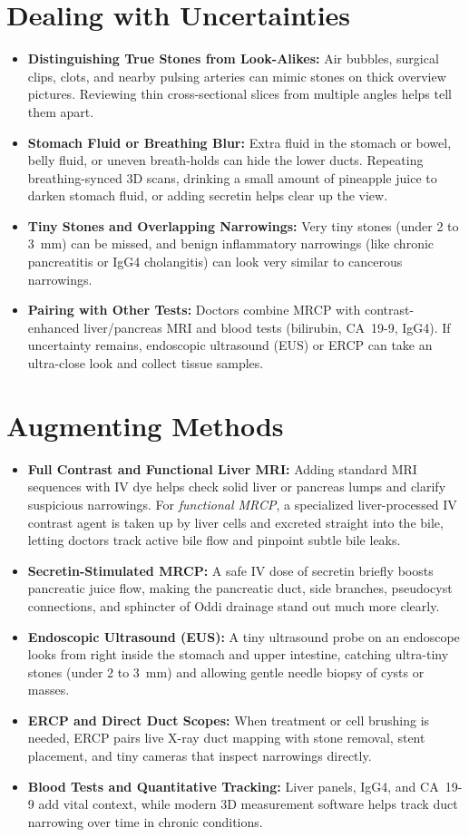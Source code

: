 \section{Dealing with Uncertainties}
\begin{itemize}
\item \textbf{Distinguishing True Stones from Look-Alikes:} Air bubbles, surgical clips, clots, and nearby pulsing arteries can mimic stones on thick overview pictures. Reviewing thin cross-sectional slices from multiple angles helps tell them apart.
\item \textbf{Stomach Fluid or Breathing Blur:} Extra fluid in the stomach or bowel, belly fluid, or uneven breath-holds can hide the lower ducts. Repeating breathing-synced 3D scans, drinking a small amount of pineapple juice to darken stomach fluid, or adding secretin helps clear up the view.
\item \textbf{Tiny Stones and Overlapping Narrowings:} Very tiny stones (under 2 to 3~mm) can be missed, and benign inflammatory narrowings (like chronic pancreatitis or IgG4 cholangitis) can look very similar to cancerous narrowings.
\item \textbf{Pairing with Other Tests:} Doctors combine MRCP with contrast-enhanced liver/pancreas MRI and blood tests (bilirubin, CA~19-9, IgG4). If uncertainty remains, endoscopic ultrasound (EUS) or ERCP can take an ultra-close look and collect tissue samples.
\end{itemize}

\section{Augmenting Methods}
\begin{itemize}
\item \textbf{Full Contrast and Functional Liver MRI:} Adding standard MRI sequences with IV dye helps check solid liver or pancreas lumps and clarify suspicious narrowings. For \emph{functional MRCP}, a specialized liver-processed IV contrast agent is taken up by liver cells and excreted straight into the bile, letting doctors track active bile flow and pinpoint subtle bile leaks.
\item \textbf{Secretin-Stimulated MRCP:} A safe IV dose of secretin briefly boosts pancreatic juice flow, making the pancreatic duct, side branches, pseudocyst connections, and sphincter of Oddi drainage stand out much more clearly.
\item \textbf{Endoscopic Ultrasound (EUS):} A tiny ultrasound probe on an endoscope looks from right inside the stomach and upper intestine, catching ultra-tiny stones (under 2 to 3~mm) and allowing gentle needle biopsy of cysts or masses.
\item \textbf{ERCP and Direct Duct Scopes:} When treatment or cell brushing is needed, ERCP pairs live X-ray duct mapping with stone removal, stent placement, and tiny cameras that inspect narrowings directly.
\item \textbf{Blood Tests and Quantitative Tracking:} Liver panels, IgG4, and CA~19-9 add vital context, while modern 3D measurement software helps track duct narrowing over time in chronic conditions.
\end{itemize}

